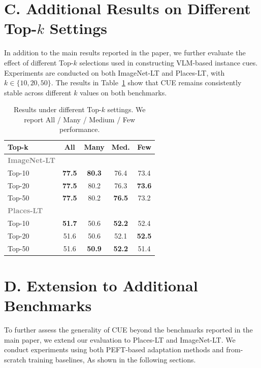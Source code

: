 \section*{C. Additional Results on Different Top-$k$ Settings}
In addition to the main results reported in the paper, we further evaluate the 
effect of different Top-$k$ selections used in constructing VLM-based instance 
cues. Experiments are conducted on both ImageNet-LT and Places-LT, with 
$k \in \{10, 20, 50\}$. The results in Table~\ref{tab:topk_all} show that CUE 
remains consistently stable across different $k$ values on both benchmarks.
\begin{table}[h]
\centering
\caption{Results under different Top-$k$ settings. We report All / Many / Medium / Few performance.}
\label{tab:topk_all}
\small
\begin{tabular}{l|cccc}
\toprule
\textbf{Top-k} & \textbf{All} & \textbf{Many} & \textbf{Med.} & \textbf{Few} \\
\midrule
\textcolor{gray}{\textbf{ImageNet-LT}} & & & & \\
\quad Top-10 & \textbf{77.5} & \textbf{80.3} & 76.4 & 73.4 \\
\quad Top-20 & \textbf{77.5} & 80.2 & 76.3 & \textbf{73.6} \\
\quad Top-50 & \textbf{77.5} & 80.2 & \textbf{76.5} & 73.2 \\[3pt]
\midrule
\textcolor{gray}{\textbf{Places-LT}} & & & & \\
\quad Top-10 & \textbf{51.7} & 50.6 &	\textbf{52.2} & 52.4 \\
\quad Top-20 &51.6& 50.6&	52.1	&\textbf{52.5}	 \\
\quad Top-50 & 51.6 & \textbf{50.9}	&\textbf{52.2}	&  51.4	 \\
\bottomrule
\end{tabular}
\vspace{-1em}
\end{table}


\section*{D. Extension to Additional Benchmarks}
To further assess the generality of CUE beyond the benchmarks reported in the 
main paper, we extend our evaluation to Places-LT and ImageNet-LT. We conduct experiments using both PEFT-based adaptation methods and from-scratch training baselines, As shown in the 
following sections.

